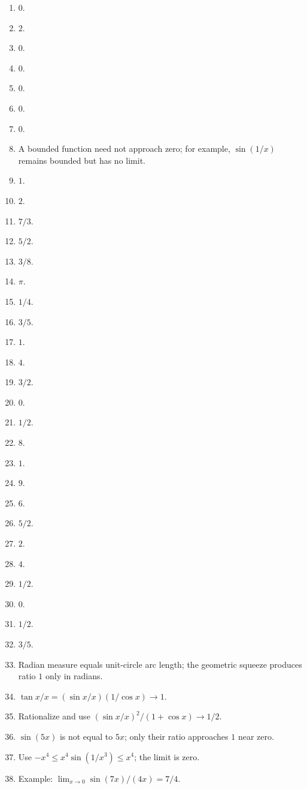 \documentclass[11pt,openany]{book}
\theoremstyle{bgplain}
\begin{document}
\begin{enumerate}[label=\textbf{3.\arabic*}]
  \item \(0\).
  \item \(2\).
  \item \(0\).
  \item \(0\).
  \item \(0\).
  \item \(0\).
  \item \(0\).
  \item A bounded function need not approach zero; for example, \(\sin(1/x)\) remains bounded but has no limit.
  \item \(1\).
  \item \(2\).
  \item \(7/3\).
  \item \(5/2\).
  \item \(3/8\).
  \item \(\pi\).
  \item \(1/4\).
  \item \(3/5\).
  \item \(1\).
  \item \(4\).
  \item \(3/2\).
  \item \(0\).
  \item \(1/2\).
  \item \(8\).
  \item \(1\).
  \item \(9\).
  \item \(6\).
  \item \(5/2\).
  \item \(2\).
  \item \(4\).
  \item \(1/2\).
  \item \(0\).
  \item \(1/2\).
  \item \(3/5\).
  \item Radian measure equals unit-circle arc length; the geometric squeeze produces ratio \(1\) only in radians.
  \item \(\tan x/x=(\sin x/x)(1/\cos x)\to1\).
  \item Rationalize and use \((\sin x/x)^2/(1+\cos x)\to1/2\).
  \item \(\sin(5x)\) is not equal to \(5x\); only their ratio approaches \(1\) near zero.
  \item Use \(-x^4\le x^4\sin(1/x^3)\le x^4\); the limit is zero.
  \item Example: \(\lim_{x\to0}\sin(7x)/(4x)=7/4\).
\end{enumerate}
\end{document}
